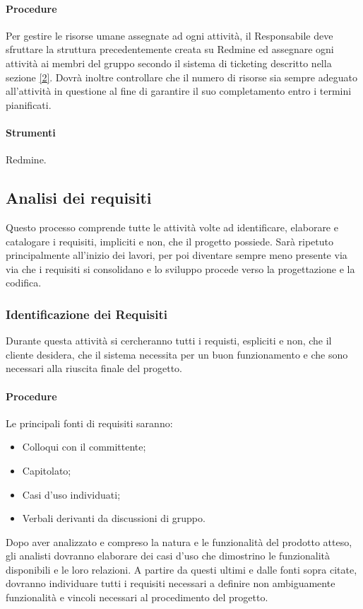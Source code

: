\paragraph{Procedure}
Per gestire le risorse umane assegnate ad ogni attività, il Responsabile deve sfruttare la struttura precedentemente creata su Redmine ed assegnare ogni attività ai membri del gruppo secondo il sistema di ticketing descritto nella sezione \ref{2}.
Dovrà inoltre controllare che il numero di risorse sia sempre adeguato all'attività in questione al fine di garantire il suo completamento entro i termini pianificati.

\paragraph{Strumenti}
Redmine.

\subsection{Analisi dei requisiti}
\label{processo_analisi}
Questo processo comprende tutte le attività volte ad identificare, elaborare e catalogare i requisiti, impliciti e non, che il progetto possiede.
Sarà ripetuto principalmente all'inizio dei lavori, per poi diventare sempre meno presente via via che i requisiti si consolidano e lo sviluppo procede verso la progettazione e la codifica.


\subsubsection{Identificazione dei Requisiti}
Durante questa attività si cercheranno tutti i requisti, espliciti e non, che il cliente desidera, che il sistema necessita per un buon funzionamento e che sono necessari alla riuscita finale del progetto.

\paragraph{Procedure}
Le principali fonti di requisiti saranno:
\begin{itemize}
\item Colloqui con il committente;
\item Capitolato;
\item Casi d'uso individuati;
\item Verbali derivanti da discussioni di gruppo.
\end{itemize}
Dopo aver analizzato e compreso la natura e le funzionalità del prodotto atteso, gli analisti dovranno elaborare dei casi d'uso che dimostrino le funzionalità disponibili e le loro relazioni.
A partire da questi ultimi e dalle fonti sopra citate, dovranno individuare tutti i requisiti necessari a definire non ambiguamente funzionalità e vincoli necessari al procedimento del progetto.


